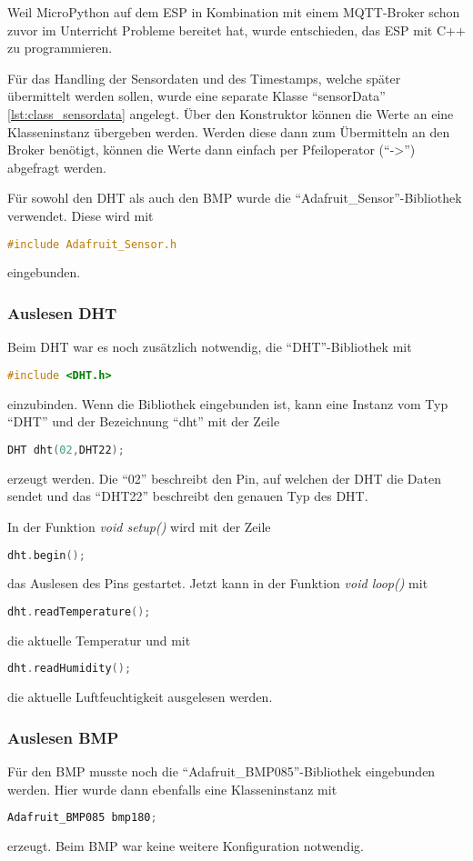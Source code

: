 Weil MicroPython auf dem ESP in Kombination mit einem MQTT-Broker schon 
zuvor im Unterricht Probleme bereitet hat, wurde entschieden, das ESP mit C++ zu programmieren.

Für das Handling der Sensordaten und des Timestamps, welche später übermittelt werden sollen, wurde eine separate Klasse "`sensorData"' \ref{lst:class_sensordata} angelegt.
Über den Konstruktor können die Werte an eine Klasseninstanz übergeben werden. 
Werden diese dann zum Übermitteln an den Broker benötigt, können die Werte dann einfach per Pfeiloperator ("`->"') abgefragt werden.

Für sowohl den DHT als auch den BMP wurde die "`Adafruit\_Sensor"'-Bibliothek verwendet.
Diese wird mit 
\begin{lstlisting}[language=C++]
	#include Adafruit_Sensor.h
\end{lstlisting}
eingebunden.

\subsubsection{Auslesen DHT}
	Beim DHT war es noch zusätzlich notwendig, die "`DHT"'-Bibliothek mit 
\begin{lstlisting}[language=C++]
	#include <DHT.h>
\end{lstlisting}
 	einzubinden.
	Wenn die Bibliothek eingebunden ist, kann eine Instanz vom Typ "`DHT"' und der Bezeichnung "`dht"' mit der Zeile 
\begin{lstlisting}[language=C++]
	DHT dht(02,DHT22);
\end{lstlisting}	
	erzeugt werden.
	Die "`02"' beschreibt den Pin, auf welchen der DHT die Daten sendet und das "`DHT22"' beschreibt den genauen Typ des DHT.
	
	In der Funktion \textit{void setup()} wird mit der Zeile
\begin{lstlisting}[language=C++]
	dht.begin();
\end{lstlisting}
	das Auslesen des Pins gestartet. 
	Jetzt kann in der Funktion \textit{void loop()} mit 
\begin{lstlisting}[language=C++]
	dht.readTemperature();
\end{lstlisting}
	die aktuelle Temperatur und mit
\begin{lstlisting}[language=C++]
	dht.readHumidity();
\end{lstlisting}
	die aktuelle Luftfeuchtigkeit ausgelesen werden.
	
\subsubsection{Auslesen BMP}
	Für den BMP musste noch die "`Adafruit\_BMP085"'-Bibliothek eingebunden werden.
	Hier wurde dann ebenfalls eine Klasseninstanz mit 
\begin{lstlisting}[language=C++]
	Adafruit_BMP085 bmp180;
\end{lstlisting}
	erzeugt. Beim BMP war keine weitere Konfiguration notwendig.
	
